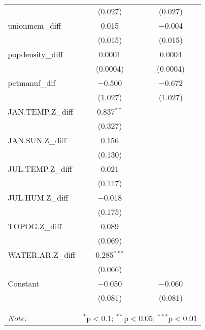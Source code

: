 \begin{table}[!htbp]
\begin{tabular}{@{\extracolsep{5pt}}lcc}
  & (0.027) & (0.027) \\ 
  unionmem\_diff & 0.015 & $-$0.004 \\ 
  & (0.015) & (0.015) \\ 
  popdensity\_diff & 0.0001 & 0.0004 \\ 
  & (0.0004) & (0.0004) \\ 
  pctmanuf\_dif & $-$0.500 & $-$0.672 \\ 
  & (1.027) & (1.027) \\ 
  JAN.TEMP.Z\_diff & 0.837$^{**}$ &  \\ 
  & (0.327) &  \\ 
  JAN.SUN.Z\_diff & 0.156 &  \\ 
  & (0.130) &  \\ 
  JUL.TEMP.Z\_diff & 0.021 &  \\ 
  & (0.117) &  \\ 
  JUL.HUM.Z\_diff & $-$0.018 &  \\ 
  & (0.175) &  \\ 
  TOPOG.Z\_diff & 0.089 &  \\ 
  & (0.069) &  \\ 
  WATER.AR.Z\_diff & 0.285$^{***}$ &  \\ 
  & (0.066) &  \\ 
  Constant & $-$0.050 & $-$0.060 \\ 
  & (0.081) & (0.081) \\ 
 \hline \\[-1.8ex] 
\hline 
\hline \\[-1.8ex] 
\textit{Note:}  & \multicolumn{2}{r}{$^{*}$p$<$0.1; $^{**}$p$<$0.05; $^{***}$p$<$0.01} \\ 
\end{tabular} 
\end{table} 
